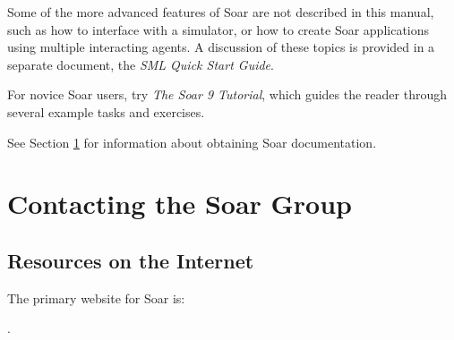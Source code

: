 Some of the more advanced features of Soar are not described in this
manual, such as how to interface with a simulator, or how to create Soar
applications using multiple interacting agents.  A discussion of
these topics is provided in a separate document, the \textit{SML Quick Start Guide}.

For novice Soar users, try \textit{The Soar 9 Tutorial}, which guides the reader 
through several example tasks and exercises.

See Section \ref{CONTACT} for information about obtaining Soar documentation.

%
%
\section{Contacting the Soar Group}
\label{CONTACT}

\subsection*{Resources on the Internet}

The primary website for Soar is:

\hspace{2em}.


